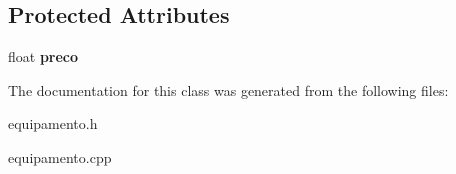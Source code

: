 \subsection*{Protected Attributes}
\begin{DoxyCompactItemize}
\item 
float {\bfseries preco}\hypertarget{class_equipamento_aa6586d6bfb902244e40cd1bc2bbd49dc}{}\label{class_equipamento_aa6586d6bfb902244e40cd1bc2bbd49dc}

\end{DoxyCompactItemize}


The documentation for this class was generated from the following files\+:\begin{DoxyCompactItemize}
\item 
equipamento.\+h\item 
equipamento.\+cpp\end{DoxyCompactItemize}
